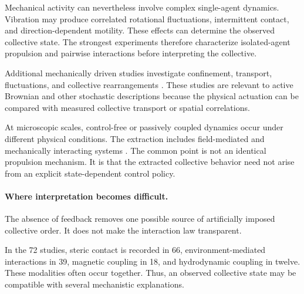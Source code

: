 Mechanical activity can nevertheless involve complex
single-agent dynamics. Vibration may produce correlated
rotational fluctuations, intermittent contact, and
direction-dependent motility. These effects can determine
the observed collective state. The strongest experiments
therefore characterize isolated-agent propulsion and
pairwise interactions before interpreting the collective.

Additional mechanically driven studies investigate
confinement, transport, fluctuations, and collective
rearrangements
\cite{MuozObreque2026dynamicsofmagnetic,Xi2024emergentbehaviorso,Tian2018flowratebehavioran,Porvatov2021optimizingselfrota,Giomi2013swarmingswirlinga,Luo2025flockingphasesepar,Musacchio2026fluidizationinduced,Deblais2018boundariescontrolc,Boudet2022effectivetemperatur,Engbring2023anonlinearfluctuat,Dmitriev2021statisticalcorrelat,Callegari2023playingwithactive,Callegari2024activematterexperi,Balda2024playingwithactive,Li2021programmingactivec,Siebers2023exploitingcompositi,Son2024emergentfunctional,Boudet2021fromcollectionsof,Wagner2026geometryinducedtra,Lvay2026collectivedynamics}.
These studies are relevant to active Brownian and
other stochastic descriptions because the physical
actuation can be compared with measured collective
transport or spatial correlations.

At microscopic scales, control-free or passively
coupled dynamics occur under different physical
conditions. The extraction includes field-mediated
and mechanically interacting systems
\cite{Calabr2026interactiondrivena,Rivas2023spatialpatterningo,Cheng2025selfassemblyandco,Yang2022emergentmicroroboti,Urso2023reconfigurableself,Yan2024programmingstructur,Yigit2020cohesiveselforgani,Desgranges2023microswimmersunder,Ceron2023programmableselfor,Wang2018collectivesofspinn,Zhang20233dprintedmicromete}.
The common point is not an identical propulsion
mechanism. It is that the extracted collective
behavior need not arise from an explicit
state-dependent control policy.

\paragraph*{Where interpretation becomes difficult.}

The absence of feedback removes one possible
source of artificially imposed collective order.
It does not make the interaction law transparent.

In the 72 studies, steric contact is recorded
in 66, environment-mediated interactions in
39, magnetic coupling in 18, and hydrodynamic
coupling in twelve. These modalities often
occur together. Thus, an observed collective
state may be compatible with several
mechanistic explanations.

